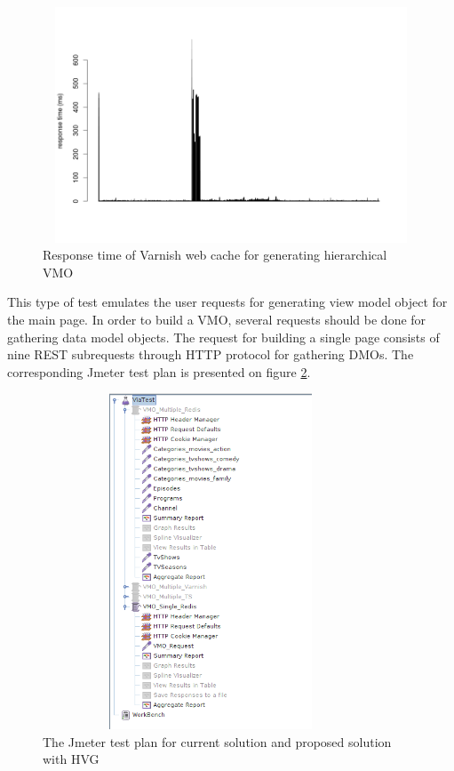 \begin{figure}[h!]
    \centering
    \includegraphics[width=15cm,height=7cm,keepaspectratio]{images/vmo_varnish_mult.png}
    \caption{Response time of Varnish web cache for generating hierarchical VMO}
    \label{fig:vmo_varnish_mult}
\end{figure}


This type of test emulates the user requests for generating view model object for the main page. In order to build a VMO, several requests should be done for gathering data model objects. The request for building a single page consists of nine REST subrequests through HTTP protocol for gathering DMOs. The corresponding Jmeter test plan is presented on figure \ref{fig:vmo_testplan}.

\begin{figure}[h!]
    \centering
    \includegraphics[width=10cm,height=10cm,keepaspectratio]{images/vmo_testplan.png}
    \caption{The Jmeter test plan for current solution and proposed solution with HVG}
    \label{fig:vmo_testplan}
\end{figure}

